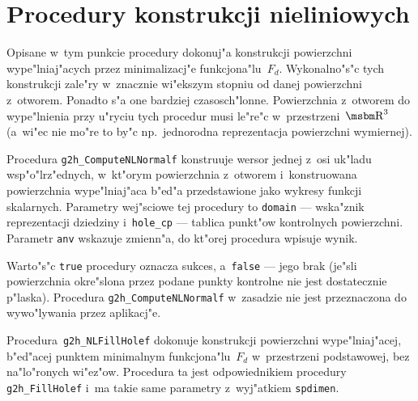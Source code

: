 \vspace{\bigskipamount}

\section{Procedury konstrukcji nieliniowych}

Opisane w~tym punkcie procedury dokonuj"a konstrukcji powierzchni wype"lniaj"acych
przez minimalizacj"e funkcjona"lu~$F_d$. Wykonalno"s"c tych konstrukcji
zale"ry w~znacznie wi"ekszym stopniu od danej powierzchni z~otworem.
Ponadto s"a one bardziej czasosch"lonne. Powierzchnia z~otworem do wype"lnienia
przy u"ryciu tych procedur musi le"re"c w~przestrzeni~$\R^3$ (a~wi"ec nie
mo"re to by"c np.\ jednorodna reprezentacja powierzchni wymiernej).

\vspace{\bigskipamount}
Procedura \texttt{g2h\_ComputeNLNormalf} konstruuje wersor jednej z~osi
uk"ladu wsp"o"lrz"ednych, w~kt"orym powierzchnia z~otworem i~konstruowana
powierzchnia wype"lniaj"aca b"ed"a przedstawione jako wykresy funkcji
skalarnych. Parametry wej"sciowe tej procedury to \texttt{domain} --- wska"znik
reprezentacji dziedziny i~\texttt{hole\_cp} --- tablica punkt"ow kontrolnych
powierzchni. Parametr \texttt{anv} wskazuje zmienn"a, do kt"orej procedura
wpisuje wynik.

Warto"s"c \texttt{true} procedury oznacza sukces, a~\texttt{false} --- jego brak
(je"sli powierzchnia okre"slona przez podane punkty kontrolne nie jest
dostatecznie p"laska). Procedura \texttt{g2h\_ComputeNLNormalf} w~zasadzie
nie jest przeznaczona do wywo"lywania przez aplikacj"e.

\vspace{\bigskipamount}
Procedura~\texttt{g2h\_NLFillHolef} dokonuje konstrukcji powierzchni
wype"lniaj"acej, b"ed"acej punktem minimalnym funkcjona"lu~$F_d$
w~przestrzeni podstawowej, bez na"lo"ronych wi"ez"ow.
Procedura ta jest odpowiednikiem procedury \texttt{g2h\_FillHolef}
i~ma takie same parametry z~wyj"atkiem \texttt{spdimen}.

